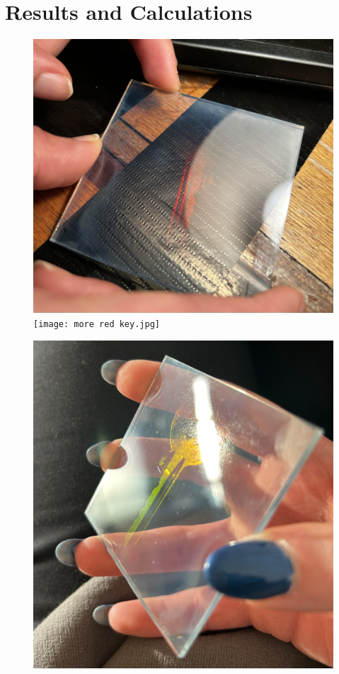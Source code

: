 \documentclass[12pt]{article}
\begin{document}
\section{Results and Calculations} \label{sec:3}

\begin{figure}[H]
    \centering
    \begin{minipage}{.5\textwidth}
        \includegraphics[width=\linewidth]{holo done 1.jpeg}
        \vfill
        \texttt{[image: more red key.jpg]}
    \end{minipage}
    \hspace{-.5em}
    \begin{minipage}{.452\textwidth}
        \includegraphics[width=\linewidth]{holo done 2 green.jpeg}

\end{minipage}
\end{figure}
\end{document}
